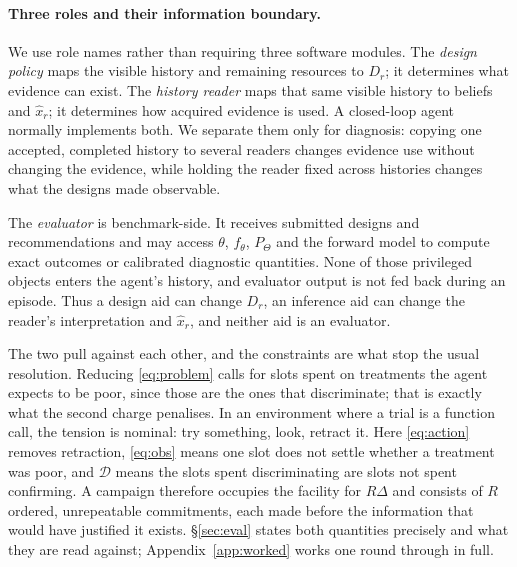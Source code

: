\paragraph{Three roles and their information boundary.}\label{sec:roles}
We use role names rather than requiring three software modules. The \emph{design policy}
maps the visible history and remaining resources to $D_r$; it determines what evidence can
exist. The \emph{history reader} maps that same visible history to beliefs and
$\hat{x}_r$; it determines how acquired evidence is used. A closed-loop agent normally
implements both. We separate them only for diagnosis: copying one accepted, completed
history to several readers changes evidence use without changing the evidence, while
holding the reader fixed across histories changes what the designs made observable.

The \emph{evaluator} is benchmark-side. It receives submitted designs and recommendations
and may access $\theta$, $f_\theta$, $P_\Theta$ and the forward model to compute exact
outcomes or calibrated diagnostic quantities. None of those privileged objects enters the
agent's history, and evaluator output is not fed back during an episode. Thus a design aid
can change $D_r$, an inference aid can change the reader's interpretation and
$\hat{x}_r$, and neither aid is an evaluator.

The two pull against each other, and the constraints are what stop the usual resolution.
Reducing \eqref{eq:problem} calls for slots spent on treatments the agent expects to be
poor, since those are the ones that discriminate; that is exactly what the second charge
penalises. In an environment where a trial is a function call, the tension is nominal: try
something, look, retract it. Here \eqref{eq:action} removes retraction, \eqref{eq:obs}
means one slot does not settle whether a treatment was poor, and $\mathcal{D}$ means the
slots spent discriminating are slots not spent confirming. A campaign therefore occupies
the facility for $R\Delta$ and consists of $R$ ordered, unrepeatable commitments, each made
before the information that would have justified it exists. \S\ref{sec:eval} states both
quantities precisely and what they are read against; Appendix~\ref{app:worked} works one
round through in full.
\FloatBarrier
